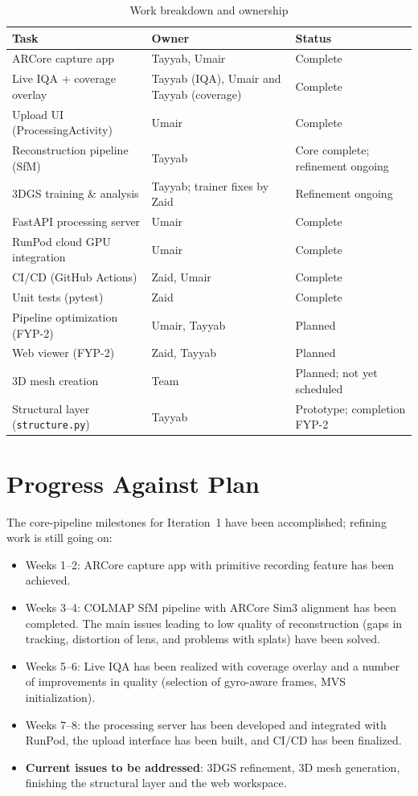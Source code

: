 \begin{table}[htbp]
\centering
\small
\caption{Work breakdown and ownership}
\label{tab:workbreakdown}
\begin{tabular}{p{4cm}p{3.5cm}p{3cm}}
\toprule
\textbf{Task} & \textbf{Owner} & \textbf{Status} \\
\midrule
ARCore capture app & Tayyab, Umair & Complete \\
Live IQA + coverage overlay & Tayyab (IQA), Umair and Tayyab (coverage) & Complete \\
Upload UI (ProcessingActivity) & Umair & Complete \\
Reconstruction pipeline (SfM) & Tayyab & Core complete; refinement ongoing \\
3DGS training \& analysis & Tayyab; trainer fixes by Zaid & Refinement ongoing \\
FastAPI processing server & Umair & Complete \\
RunPod cloud GPU integration & Umair & Complete \\
CI/CD (GitHub Actions) & Zaid, Umair & Complete \\
Unit tests (pytest) & Zaid & Complete \\
Pipeline optimization (FYP-2) & Umair, Tayyab & Planned \\
Web viewer (FYP-2) & Zaid, Tayyab & Planned \\
3D mesh creation & Team & Planned; not yet scheduled \\
Structural layer (\texttt{structure.py}) & Tayyab & Prototype; completion FYP-2 \\
\bottomrule
\end{tabular}
\end{table}

\section{Progress Against Plan}
The core-pipeline milestones for Iteration~1 have been accomplished; refining work is still going on:
\begin{itemize}
    \item Weeks 1--2: ARCore capture app with primitive recording feature has been achieved.
    \item Weeks 3--4: COLMAP SfM pipeline with ARCore Sim3 alignment has been completed. The main issues leading to low quality of reconstruction (gaps in tracking, distortion of lens, and problems with splats) have been solved.
    \item Weeks 5--6: Live IQA has been realized with coverage overlay and a number of improvements in quality (selection of gyro-aware frames, MVS initialization).
    \item Weeks 7--8: the processing server has been developed and integrated with RunPod, the upload interface has been built, and CI/CD has been finalized.
    \item \textbf{Current issues to be addressed}: 3DGS refinement, 3D mesh generation, finishing the structural layer and the web workspace.
\end{itemize}

